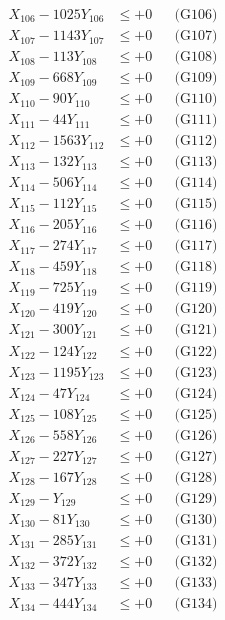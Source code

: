 \documentclass[a4paper,10pt]{article}
\begin{document}
{\begin{align}
X_{106} - 1025Y_{106} &\leq +0 && \text{(G106)} \\
X_{107} - 1143Y_{107} &\leq +0 && \text{(G107)} \\
X_{108} - 113Y_{108} &\leq +0 && \text{(G108)} \\
X_{109} - 668Y_{109} &\leq +0 && \text{(G109)} \\
X_{110} - 90Y_{110} &\leq +0 && \text{(G110)} \\
\allowbreak
X_{111} - 44Y_{111} &\leq +0 && \text{(G111)} \\
X_{112} - 1563Y_{112} &\leq +0 && \text{(G112)} \\
X_{113} - 132Y_{113} &\leq +0 && \text{(G113)} \\
X_{114} - 506Y_{114} &\leq +0 && \text{(G114)} \\
X_{115} - 112Y_{115} &\leq +0 && \text{(G115)} \\
X_{116} - 205Y_{116} &\leq +0 && \text{(G116)} \\
X_{117} - 274Y_{117} &\leq +0 && \text{(G117)} \\
X_{118} - 459Y_{118} &\leq +0 && \text{(G118)} \\
X_{119} - 725Y_{119} &\leq +0 && \text{(G119)} \\
X_{120} - 419Y_{120} &\leq +0 && \text{(G120)} \\
\allowbreak
X_{121} - 300Y_{121} &\leq +0 && \text{(G121)} \\
X_{122} - 124Y_{122} &\leq +0 && \text{(G122)} \\
X_{123} - 1195Y_{123} &\leq +0 && \text{(G123)} \\
X_{124} - 47Y_{124} &\leq +0 && \text{(G124)} \\
X_{125} - 108Y_{125} &\leq +0 && \text{(G125)} \\
X_{126} - 558Y_{126} &\leq +0 && \text{(G126)} \\
X_{127} - 227Y_{127} &\leq +0 && \text{(G127)} \\
X_{128} - 167Y_{128} &\leq +0 && \text{(G128)} \\
X_{129} - Y_{129} &\leq +0 && \text{(G129)} \\
X_{130} - 81Y_{130} &\leq +0 && \text{(G130)} \\
\allowbreak
X_{131} - 285Y_{131} &\leq +0 && \text{(G131)} \\
X_{132} - 372Y_{132} &\leq +0 && \text{(G132)} \\
X_{133} - 347Y_{133} &\leq +0 && \text{(G133)} \\
X_{134} - 444Y_{134} &\leq +0 && \text{(G134)} \\

\end{align}}
\end{document}
